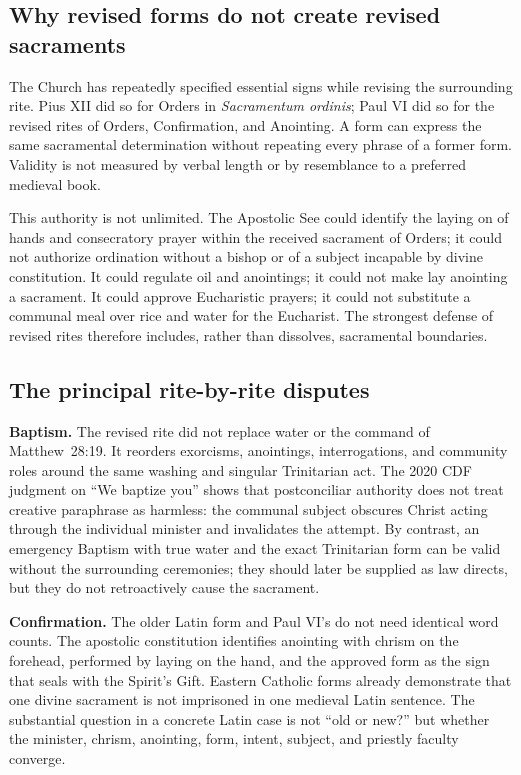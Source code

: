 \subsection{Why revised forms do not create revised sacraments}

The Church has repeatedly specified essential signs while revising the surrounding rite. Pius XII did so for Orders in \emph{Sacramentum ordinis}; Paul VI did so for the revised rites of Orders, Confirmation, and Anointing. A form can express the same sacramental determination without repeating every phrase of a former form. Validity is not measured by verbal length or by resemblance to a preferred medieval book.

This authority is not unlimited. The Apostolic See could identify the laying on of hands and consecratory prayer within the received sacrament of Orders; it could not authorize ordination without a bishop or of a subject incapable by divine constitution. It could regulate oil and anointings; it could not make lay anointing a sacrament. It could approve Eucharistic prayers; it could not substitute a communal meal over rice and water for the Eucharist. The strongest defense of revised rites therefore includes, rather than dissolves, sacramental boundaries.

\subsection{The principal rite-by-rite disputes}

\textbf{Baptism.} The revised rite did not replace water or the command of Matthew~28:19. It reorders exorcisms, anointings, interrogations, and community roles around the same washing and singular Trinitarian act. The 2020 CDF judgment on “We baptize you” shows that postconciliar authority does not treat creative paraphrase as harmless: the communal subject obscures Christ acting through the individual minister and invalidates the attempt. By contrast, an emergency Baptism with true water and the exact Trinitarian form can be valid without the surrounding ceremonies; they should later be supplied as law directs, but they do not retroactively cause the sacrament.

\textbf{Confirmation.} The older Latin form and Paul VI's  do not need identical word counts. The apostolic constitution identifies anointing with chrism on the forehead, performed by laying on the hand, and the approved form as the sign that seals with the Spirit's Gift. Eastern Catholic forms already demonstrate that one divine sacrament is not imprisoned in one medieval Latin sentence. The substantial question in a concrete Latin case is not “old or new?” but whether the minister, chrism, anointing, form, intent, subject, and priestly faculty converge.

